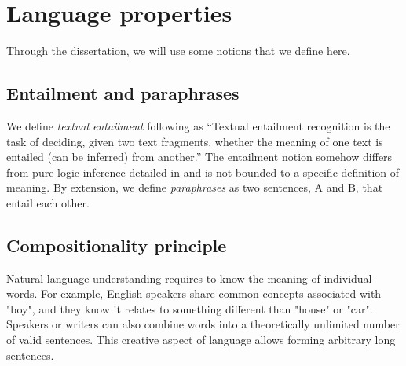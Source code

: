 \section{Language properties}

Through the dissertation, we will use some notions that we define here.

\subsection{Entailment and paraphrases}

We define \textit{textual entailment} following \textcite{dagan_10} as ``Textual entailment recognition is the task of deciding, given two text fragments, whether the meaning of one text is entailed (can be inferred) from another.'' The entailment notion somehow differs from pure logic inference detailed in  and is not bounded to a specific definition of meaning. By extension, we define \textit{paraphrases} as two sentences, A and B, that entail each other.


\subsection{Compositionality principle}

Natural language understanding requires to know the meaning of individual words. For example, English speakers share common concepts associated with "boy", and they know it relates to something different than "house" or "car". Speakers or writers can also combine words into a theoretically unlimited number of valid sentences. This creative aspect of language allows forming arbitrary long sentences. 

